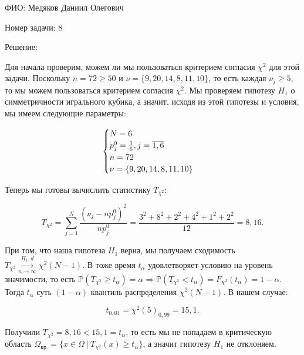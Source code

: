 \documentclass[14pt]{extarticle}
\begin{document}
ФИО: Медяков Даниил Олегович

\vspace{10pt}

Номер задачи: 8

\vspace{10pt}

Решение:

\vspace{10pt}

Для начала проверим, можем ли мы пользоваться критерием согласия $\chi^2$ для этой задачи. Поскольку $n = 72 \geq 50$ и $\nu = \{9, 20, 14, 8, 11, 10\}$, то есть каждая $\nu_j \geq 5$, то мы можем пользоваться критерием согласия $\chi^2$. Мы проверяем гипотезу $H_1$ о симметричности игрального кубика, а значит, исходя из этой гипотезы и условия, мы имеем следующие параметры:

\begin{eqnarray}
\notag
\begin{cases}
    N = 6\\
    p_j^0 = \frac{1}{6}, j=\overline{1, 6}\\
    n = 72\\
    \nu = \{9, 20, 14, 8, 11, 10\}
\end{cases}
\end{eqnarray}

Теперь мы готовы вычислить статистику $T_{\chi^2}$:

\begin{equation*}
    T_{\chi^2} = \sum\limits_{j=1}^N \frac{\left(\nu_j - np_j^0\right)^2}{np_j^0} = \frac{3^2 + 8^2 + 2^2 + 4^2 + 1^2 + 2^2}{12} = 8,16.
\end{equation*}


При том, что наша гипотеза $H_1$ верна, мы получаем сходимость $T_{\chi^2}\overset{H_1, d}{\underset{n\rightarrow\infty}{\longrightarrow}} \chi^2(N-1)$. В тоже время $t_{\alpha}$ удовлетворяет условию на уровень значимости, то есть $\mathbb P(T_{\chi^2} \geq t_{\alpha}) = \alpha\Rightarrow \mathbb P(T_{\chi^2} < t_\alpha) = F_{\chi^2} (t_{\alpha}) = 1 - \alpha$. Тогда $t_{\alpha}$ суть $(1-\alpha)$ квантиль распределения $\chi^2(N-1)$. В нашем случае:

\begin{equation*}
    t_{0,01} = \chi^2(5)_{0,99} = 15,1.
\end{equation*}

Получили $T_{\chi^2} = 8,16 < 15,1 = t_{\alpha}$, то есть мы не попадаем в критическую область $\Omega_{\text{кр.}} = \{x\in\Omega ~|~ T_{\chi^2}(x) \geq t_{\alpha}\}$, а значит гипотезу $H_1$ не отклоняем.
\end{document}
